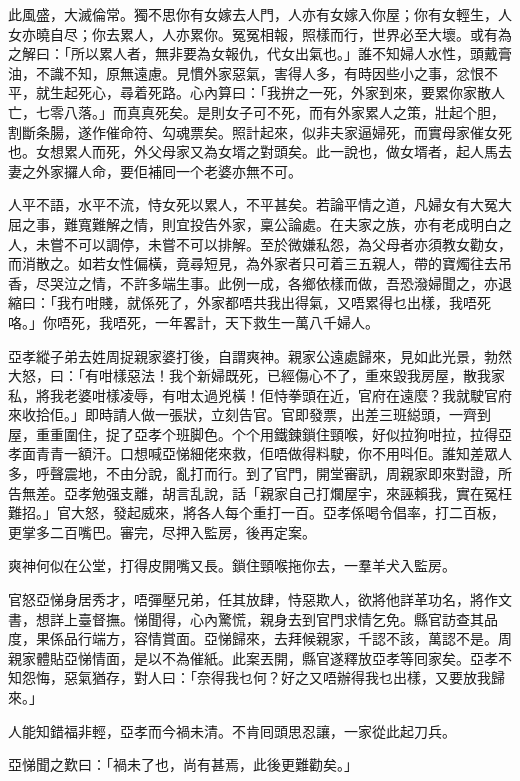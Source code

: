 \documentclass[a5paper, 12pt, openany]{book} %
\begin{document}
	此風盛，大滅倫常。獨不思你有女嫁去人門，人亦有女嫁入你屋；你有女輕生，人女亦曉自尽；你去累人，人亦累你。冤冤相報，照樣而行，世界必至大壞。或有為之解曰：「所以累人者，無非要為女報仇，代女出氣也。」誰不知婦人水性，頭戴膏油，不識不知，原無遠慮。見慣外家惡氣，害得人多，有時因些小之事，忿恨不平，就生起死心，尋着死路。心內算曰：「我拚之一死，外家到來，要累你家散人亡，七零八落。」而真真死矣。是則女子可不死，而有外家累人之策，壯起个胆，割斷条腸，遂作催命符、勾魂票矣。照計起來，似非夫家逼婦死，而實母家催女死也。女想累人而死，外父母家又為女壻之對頭矣。此一說也，做女壻者，起人馬去妻之外家攞人命，要佢補囘一个老婆亦無不可。

	人平不語，水平不流，恃女死以累人，不平甚矣。若論平情之道，凡婦女有大冤大屈之事，難寬難解之情，則宜投告外家，稟公論處。在夫家之族，亦有老成明白之人，未嘗不可以調停，未嘗不可以排解。至於微嫌私怨，為父母者亦須教女勸女，而消散之。如若女性偏橫，竟尋短見，為外家者只可着三五親人，帶的寶燭往去吊香，尽哭泣之情，不許多端生事。此例一成，各鄉依樣而做，吾恐潑婦聞之，亦退縮曰：「我冇咁賤，就係死了，外家都唔共我出得氣，又唔累得乜出樣，我唔死咯。」你唔死，我唔死，一年畧計，天下救生一萬八千婦人。

	亞孝縱子弟去姓周捉親家婆打後，自謂爽神。親家公遠處歸來，見如此光景，勃然大怒，曰：「有咁樣惡法！我个新婦既死，已經傷心不了，重來毀我房屋，散我家私，將我老婆咁樣凌辱，有咁太過兇橫！佢恃拳頭在近，官府在遠麼？我就駛官府來收拾佢。」即時請人做一張狀，立刻告官。官即發票，出差三班縂頭，一齊到屋，重重圍住，捉了亞孝个班脚色。个个用鐵鍊鎖住頸喉，好似拉狗咁拉，拉得亞孝面青青一額汗。口想喊亞悌細佬來救，佢唔做得料駛，你不用呌佢。誰知差眾人多，呼聲震地，不由分說，亂打而行。到了官門，開堂審訊，周親家即來對證，所告無差。亞孝勉强支離，胡言乱說，話「親家自己打爛屋宇，來誣賴我，實在冤枉難招。」官大怒，發起威來，將各人每个重打一百。亞孝係喝令倡率，打二百板，更掌多二百嘴巴。審完，尽押入監房，後再定案。

	爽神何似在公堂，打得皮開嘴又長。鎖住頸喉拖你去，一羣羊犬入監房。

	官怒亞悌身居秀才，唔彈壓兄弟，任其放肆，恃惡欺人，欲將他詳革功名，將作文書，想詳上臺督撫。悌聞得，心內驚慌，親身去到官門求情乞免。縣官訪查其品度，果係品行端方，容情賞面。亞悌歸來，去拜候親家，千認不該，萬認不是。周親家體貼亞悌情面，是以不為催紙。此案丟開，縣官遂釋放亞孝等囘家矣。亞孝不知怨悔，惡氣猶存，對人曰：「奈得我乜何？好之又唔辦得我乜出樣，又要放我歸來。」

	人能知錯福非輕，亞孝而今禍未清。不肯囘頭思忍讓，一家從此起刀兵。

	亞悌聞之歎曰：「禍未了也，尚有甚焉，此後更難勸矣。」
\end{document}

